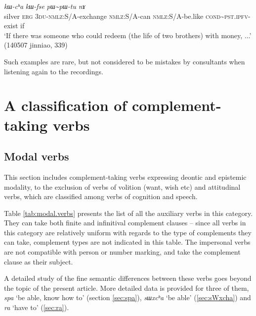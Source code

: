 \documentclass[oneside,a4paper,11pt]{article}
\newcommand{\ipa}[1]{\textit{\phon#1}}
\newcommand{\jpg}[2]{\ipa{#1} `#2'}
\newcommand{\tld}{\textasciitilde{}}
\begin{document}
\begin{exe}
\ex \label{ndZikWsAndu}
\gll [\ipa{rŋɯl} 	\ipa{kɯ} 	\ipa{ndʑi-kɯ-sɤndu}] 	\ipa{kɯ-cʰa} 	\ipa{kɯ-fse} 	\ipa{pɯ\tld{}pɯ-tu} 	\ipa{nɤ} \\
silver \textsc{erg} \textsc{3du-nmlz}:S/A-exchange \textsc{nmlz}:S/A-can \textsc{nmlz}:S/A-be.like 
\textsc{cond}\tld{}\textsc{pst.ipfv}-exist if \\
\glt `If there was someone who could redeem (the life of two brothers) with money, ...' (140507 jinniao, 339)
\end{exe}

Such examples are rare, but not considered to be mistakes by consultants when listening again to the recordings.
 
 
  \section{A classification of complement-taking verbs} 
  \subsection{Modal verbs}
This section includes complement-taking verbs expressing deontic and epistemic modality, to the exclusion of verbs of volition (want, wish etc) and attitudinal verbs, which are classified among verbs of cognition and speech.

Table \ref{tab:modal.verbs} presents the list of all the auxiliary verbs in this category. They can take both finite and infinitival complement clauses -- since all verbs in this category are relatively uniform with regards to the type of complements they can take, complement types are not indicated in this table. The impersonal verbs are not compatible with person or number marking, and take the complement clause as their subject. 

A detailed study of the fine semantic differences between these verbs goes beyond the topic of the present article. More detailed data is provided for three of them, \jpg{spa}{be able, know how to} (section \ref{sec:spa}), \jpg{sɯxcʰa}{be able} (\ref{sec:sWxcha}) and \jpg{ra}{have to} (\ref{sec:ra}).  
\end{document}
